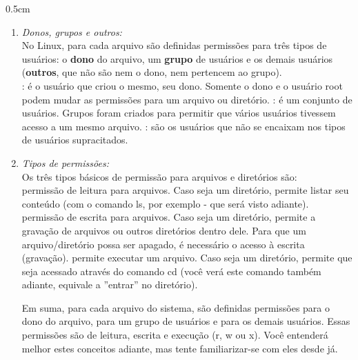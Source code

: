\begin{refsection}
\begin {myindentpar}{0.5cm}
\begin{enumerate}[\itshape i.]
 \item \textit{Donos, grupos e outros:}\\
  No Linux, para cada arquivo são definidas permissões para três tipos de usuários: o \textbf{dono} do arquivo, um \textbf{grupo} de usuários e os demais usuários (\textbf{outros}, que não são nem o dono, nem pertencem ao grupo).\\
	: é o usuário que criou o mesmo, seu dono. Somente o dono e o usuário root podem mudar as permissões para um arquivo ou diretório.
	: é um conjunto de usuários. Grupos foram criados para permitir que vários usuários tivessem acesso a um mesmo arquivo.
	: são os usuários que não se encaixam nos tipos de usuários supracitados.

 \item \textit{Tipos de permissões:}\\
 Os três tipos básicos de permissão para arquivos e diretórios são:\\
	 permissão de leitura para arquivos. Caso seja um diretório, permite listar seu conteúdo (com o comando ls, por exemplo - que será visto adiante).
	 permissão de escrita para arquivos. Caso seja um diretório, permite a gravação de arquivos ou outros diretórios dentro dele. Para que um arquivo/diretório possa ser apagado, é necessário o acesso à escrita (gravação).
	 permite executar um arquivo. Caso seja um diretório, permite que seja acessado através do comando cd (você verá este comando também adiante, equivale a ''entrar'' no diretório).

 Em suma, para cada arquivo do sistema, são definidas permissões para o dono do arquivo, para um grupo de usuários e para os demais usuários. Essas permissões são de leitura, escrita e execução (r, w ou x). Você entenderá melhor estes conceitos adiante, mas tente familiarizar-se com eles desde já.\\

\end{enumerate}
\end{myindentpar}


\end{refsection}
